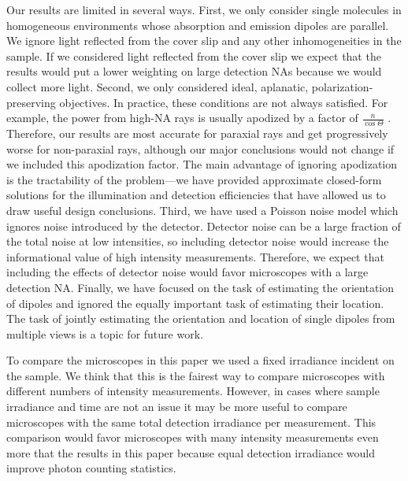 \documentclass[10pt]{article}
\begin{document}
Our results are limited in several ways. First, we only consider single
molecules in homogeneous environments whose absorption and emission dipoles are
parallel. We ignore light reflected from the cover slip and any other
inhomogeneities in the sample. If we considered light reflected from the cover
slip we expect that the results would put a lower weighting on large detection
NAs because we would collect more light. Second, we only considered ideal,
aplanatic, polarization-preserving objectives. In practice, these conditions are
not always satisfied. For example, the power from high-NA rays is usually
apodized by a factor of $\frac{n}{\cos\Theta}$ \cite{nov2006}. Therefore, our
results are most accurate for paraxial rays and get progressively worse for
non-paraxial rays, although our major conclusions would not change if we
included this apodization factor. The main advantage of ignoring apodization is
the tractability of the problem---we have provided approximate closed-form
solutions for the illumination and detection efficiencies that have allowed us
to draw useful design conclusions. Third, we have used a Poisson noise model
which ignores noise introduced by the detector. Detector noise can be a large
fraction of the total noise at low intensities, so including detector noise
would increase the informational value of high intensity
measurements. Therefore, we expect that including the effects of detector noise
would favor microscopes with a large detection NA. Finally, we have focused on
the task of estimating the orientation of dipoles and ignored the equally
important task of estimating their location. The task of jointly estimating the
orientation and location of single dipoles from multiple views is a topic for
future work.

To compare the microscopes in this paper we used a fixed irradiance incident on
the sample. We think that this is the fairest way to compare microscopes with
different numbers of intensity measurements. However, in cases where sample
irradiance and time are not an issue it may be more useful to compare
microscopes with the same total detection irradiance per measurement. This
comparison would favor microscopes with many intensity measurements even more
that the results in this paper because equal detection irradiance would improve
photon counting statistics.

\end{document}
